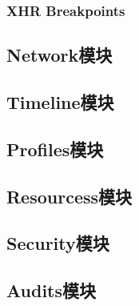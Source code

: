 \subsubsection{XHR Breakpoints}

\subsection{Network模块}
\subsection{Timeline模块}
\subsection{Profiles模块}
\subsection{Resourcess模块}
\subsection{Security模块}
\subsection{Audits模块}
